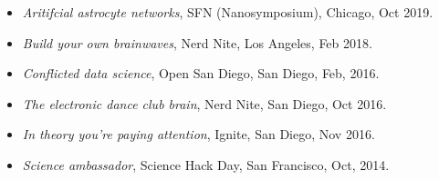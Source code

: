 \begin{itemize}
\tightlist
\item
  \emph{Aritifcial astrocyte networks}, SFN (Nanosymposium), Chicago,
  Oct 2019.
\item
  \emph{Build your own brainwaves}, Nerd Nite, Los Angeles, Feb 2018.
\item
  \emph{Conflicted data science}, Open San Diego, San Diego, Feb, 2016.
\item
  \emph{The electronic dance club brain}, Nerd Nite, San Diego, Oct
  2016.
\item
  \emph{In theory you're paying attention}, Ignite, San Diego, Nov 2016.
\item
  \emph{Science ambassador}, Science Hack Day, San Francisco, Oct, 2014.
\end{itemize}
